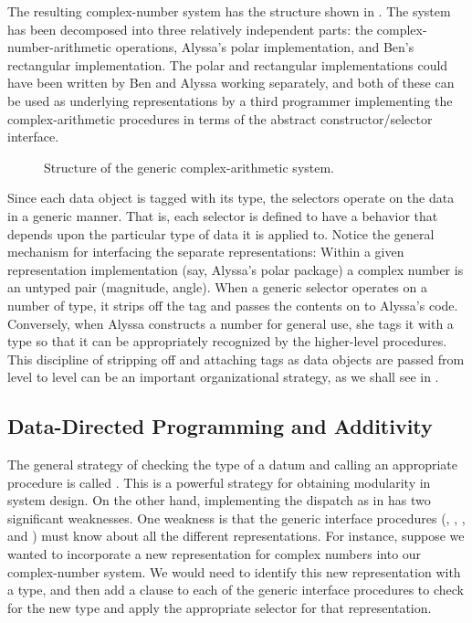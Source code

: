 The resulting complex-number system has the structure shown in .
The system has been decomposed into three relatively independent parts:
the complex-number-arithmetic operations, Alyssa’s polar implementation, and Ben’s rectangular implementation.
The polar and rectangular implementations could have been written by Ben and Alyssa working separately, and both of these can be used as underlying representations by a third programmer implementing the complex-arithmetic procedures in terms of the abstract constructor/selector interface.

\begin{figure}[tb]
	\centering
	
	\caption{
		Structure of the generic complex-arithmetic system.
	}
	\label{Figure 2.21}
\end{figure}

Since each data object is tagged with its type, the selectors operate on the data in a generic manner.
That is, each selector is defined to have a behavior that depends upon the particular type of data it is applied to.
Notice the general mechanism for interfacing the separate representations:
Within a given representation implementation (say, Alyssa’s polar package) a complex number is an untyped pair (magnitude, angle).
When a generic selector operates on a number of  type, it strips off the tag and passes the contents on to Alyssa’s code.
Conversely, when Alyssa constructs a number for general use, she tags it with a type so that it can be appropriately recognized by the higher-level procedures.
This discipline of stripping off and attaching tags as data objects are passed from level to level can be an important organizational strategy, as we shall see in .



\subsection{Data-Directed Programming and Additivity}
\label{Section 2.4.3}

The general strategy of checking the type of a datum and calling an appropriate procedure is called .
This is a powerful strategy for obtaining modularity in system design.
On the other hand, implementing the dispatch as in  has two significant weaknesses.
One weakness is that the generic interface procedures (, , , and ) must know about all the different representations.
For instance, suppose we wanted to incorporate a new representation for complex numbers into our complex-number system.
We would need to identify this new representation with a type, and then add a clause to each of the generic interface procedures to check for the new type and apply the appropriate selector for that representation.


